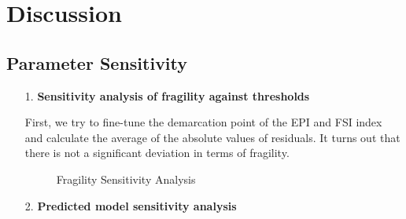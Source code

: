\section{Discussion}
\label{sec:disc}
\subsection{Parameter Sensitivity}

\begin{itemize}
   \item[1.] \textbf{Sensitivity analysis of fragility against thresholds}

First, we try to fine-tune the demarcation point of the EPI and FSI index and calculate the average of the absolute values of residuals. It turns out that there is not a significant deviation in terms of fragility.
\begin{figure}[htbp]
    \centering
    \caption{Fragility Sensitivity Analysis}
    \label{fig:exp:future}
\end{figure}
   \item[2.] \textbf{Predicted model sensitivity analysis}


\end{itemize}

